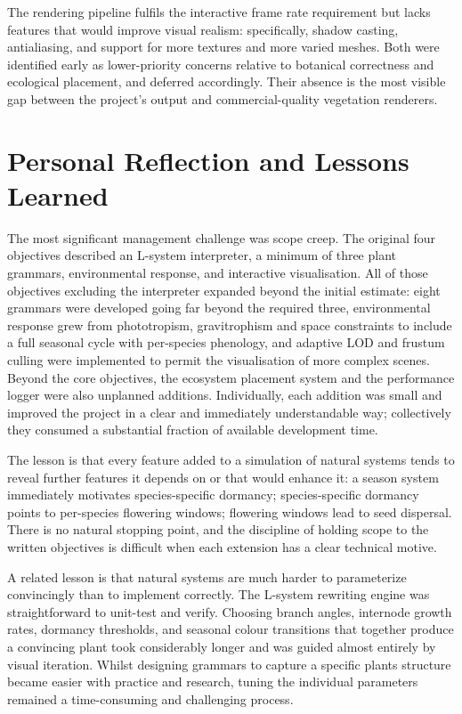 \begin{appendices}
\medskip
The rendering pipeline fulfils the interactive frame rate requirement but lacks features that would improve
visual realism: specifically, shadow casting, antialiasing, and support for more textures and more varied
meshes. Both were identified early as lower-priority concerns relative to botanical correctness and
ecological placement, and deferred accordingly. Their absence is the most visible gap between the project's
output and commercial-quality vegetation renderers.

\section{Personal Reflection and Lessons Learned}

The most significant management challenge was scope creep. The original four objectives described an L-system
interpreter, a minimum of three plant grammars, environmental response, and interactive visualisation. All of those
objectives excluding the interpreter expanded beyond the initial estimate: eight grammars were developed
going far beyond the required three, environmental response grew from phototropism, gravitrophism and space
constraints to include a full seasonal cycle with per-species phenology, and adaptive LOD and frustum culling
were implemented to permit the visualisation of more complex scenes. Beyond the core objectives, the
ecosystem placement system and the performance logger were also unplanned additions. Individually, each
addition was small and improved the project in a clear and immediately understandable way; collectively they
consumed a substantial fraction of available development time.

\medskip
The lesson is that every feature added to a simulation of natural systems tends to reveal further features it
depends on or that would enhance it: a season system immediately motivates species-specific dormancy;
species-specific dormancy points to per-species flowering windows; flowering windows lead to seed dispersal.
There is no natural stopping point, and the discipline of holding scope to the written objectives is
difficult when each extension has a clear technical motive.

\medskip
A related lesson is that natural systems are much harder to parameterize convincingly than to implement
correctly. The L-system rewriting engine was straightforward to unit-test and verify. Choosing branch angles,
internode growth rates, dormancy thresholds, and seasonal colour transitions that together produce a
convincing plant took considerably longer and was guided almost entirely by visual iteration. Whilst
designing grammars to capture a specific plants structure became easier with practice and research, tuning
the individual parameters remained a time-consuming and challenging process.


\end{appendices}
